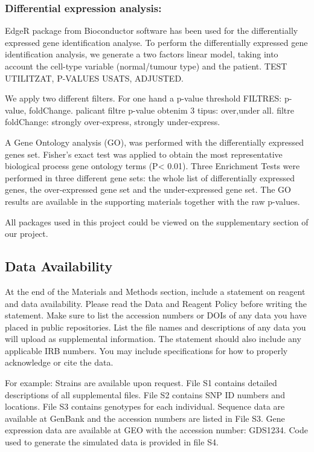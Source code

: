 \documentclass[9pt,twocolumn,twoside]{gsajnl}
\begin{document}
\subsubsection*{Differential expression analysis:}
 EdgeR package from Bioconductor software has been used for the differentially expressed gene identification analyse. To perform the differentially expressed gene identification analysis, we generate a two factors linear model, taking into account the cell-type variable (normal/tumour type) and the patient. TEST UTILITZAT, P-VALUES USATS, ADJUSTED.
 
 We apply two different filters. For one hand a p-value threshold  
 FILTRES: p-value, foldChange.
 palicant filtre p-value obtenim 3 tipus: over,under all.
 filtre foldChange: strongly over-express, strongly under-express.

A Gene Ontology analysis (GO), was performed with the differentially expressed genes set. Fisher's exact test was applied to obtain the most representative biological process gene ontology terms (P< 0.01).  Three Enrichment Tests were performed in three different gene sets: the whole list of differentially expressed genes, the over-expressed gene set and the under-expressed gene set. The GO results are available in the supporting materials together with the raw p-values.

All packages used in this project could be viewed on the supplementary section of our project.





\subsection*{Data Availability}

At the end of the Materials and Methods section, include a statement on reagent and data availability. Please read the Data and Reagent Policy before writing the statement. Make sure to list the accession numbers or DOIs of any data you have placed in public repositories. List the file names and descriptions of any data you will upload as supplemental information. The statement should also include any applicable IRB numbers. You may include specifications for how to properly acknowledge or cite the data.

For example: Strains are available upon request. File S1 contains detailed descriptions of all supplemental files. File S2 contains SNP ID numbers and locations. File S3 contains genotypes for each individual. Sequence data are available at GenBank and the accession numbers are listed in File S3. Gene expression data are available at GEO with the accession number: GDS1234. Code used to generate the simulated data is provided in file S4. 
\end{document}

